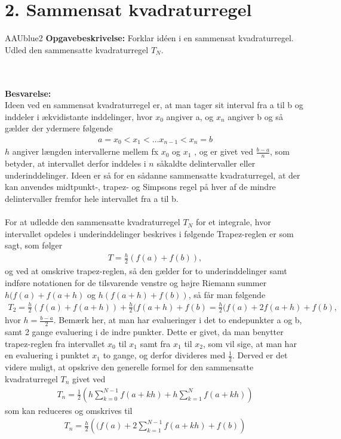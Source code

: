 \section*{2. Sammensat kvadraturregel}
% 
%
\begin{color}{AAUblue2}
%
\textbf{Opgavebeskrivelse:} 
Forklar idéen i en sammensat kvadraturregel. Udled den sammensatte kvadraturregel
$T_N$.
% 
\end{color}
\\\\
% 
\textbf{Besvarelse:} \\
Ideen ved en sammensat kvadraturregel er, at man tager sit interval fra a til b og inddeler i ækvidistante inddelinger, hvor $x_0$ angiver a, og $x_n$ angiver b og så gælder der ydermere følgende
\begin{align*}
a = x_0 < x_1 < … x_{n-1} < x_n = b
\end{align*}
$h$ angiver længden intervallerne mellem fx $x_0$ og $x_1$ , og er givet ved $\frac{b-a}{n}$, som betyder, at intervallet derfor inddeles i $n$ såkaldte delintervaller eller underinddelinger. 
Ideen er så for en sådanne sammensatte kvadraturregel, at der kan anvendes midtpunkt-, trapez- og Simpsons regel på hver af de mindre delintervaller fremfor hele intervallet fra a til b. 
\\\\
For at udledde den sammensatte kvadraturregel $T_N$ for et integrale, hvor intervallet opdeles i underinddelinger beskrives i følgende
Trapez-reglen er som sagt, som følger
\begin{align*}
T = \frac{h}{2}(f(a)+f(b)),
\end{align*}
og ved at omskrive trapez-reglen, så den gælder for to underinddelinger samt indføre notationen for de tilsvarende venstre og højre Riemann summer $h(f(a)+f(a+h)$ og $h(f(a+h)+f(b))$, så får man følgende 
\begin{align*}
T_2=\frac{h}{2}(f(a)+f(a+h))+\frac{h}{2}(f(a+h)+f(b)= \frac{h}{2}(f(a)+2f(a+h)+f(b),
\end{align*}
hvor $h=\frac{b-a}{2}$. Bemærk her, at man har evalueringer i det to endepunkter a og b, samt 2 gange evaluering i de indre punkter. Dette er givet, da man benytter trapez-reglen fra intervallet $x_0$ til $x_1$ samt fra $x_1$ til $x_2$, som vil sige, at man har en evaluering i punktet $x_1$ to gange, og derfor divideres med $\frac{1}{2}$. Derved er det  videre muligt, at opskrive den generelle formel for den sammensatte kvadraturregel $T_n$ givet ved
\begin{align*}
T_n = \frac{1}{2}\left (  h\sum_{k=0}^{N-1}f(a+kh)+h\sum_{k=1}^{N}f(a+kh)\right )
\end{align*}
som kan reduceres og omskrives til 
\begin{align*}
T_n =\frac{h}{2}\left ((f(a)+2\sum_{k=1}^{N-1}f(a+kh)+f(b) \right )
\end{align*}
%